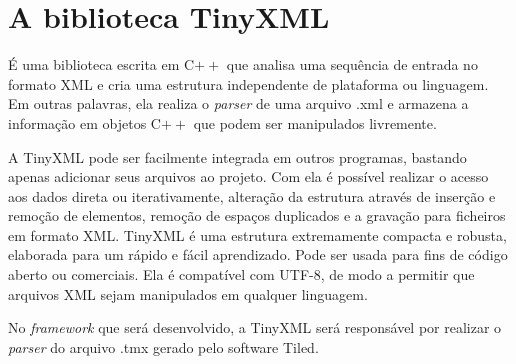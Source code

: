 \documentclass[a4paper,12pt]{report}
\begin{document}
\section{A biblioteca TinyXML}
\label{tinyXML}
%
É uma biblioteca escrita em C$++$ que analisa uma sequência de entrada no formato XML e cria uma estrutura independente 
de plataforma ou linguagem. Em outras palavras, ela realiza o \textit{parser} de uma arquivo .xml e armazena a informação 
em objetos C$++$ que podem ser manipulados livremente. 
\par 
A TinyXML pode ser facilmente integrada em outros programas, bastando apenas adicionar seus 
arquivos ao projeto. Com ela é possível realizar o acesso aos dados direta ou iterativamente, alteração da estrutura através 
de inserção e remoção de elementos, remoção de espaços duplicados e a gravação para ficheiros em formato XML.
TinyXML é uma estrutura extremamente compacta e robusta, elaborada para um rápido e fácil aprendizado. Pode ser usada para 
fins de código aberto ou comerciais. Ela é compatível com UTF-8, de modo a permitir que arquivos XML sejam manipulados em 
qualquer linguagem.
\par
No \textit{framework} que será desenvolvido, a TinyXML será responsável por realizar o \textit{parser} do arquivo .tmx gerado
pelo software Tiled.
%
%
% 
% 
% 
% 
% 
% 
\end{document}
